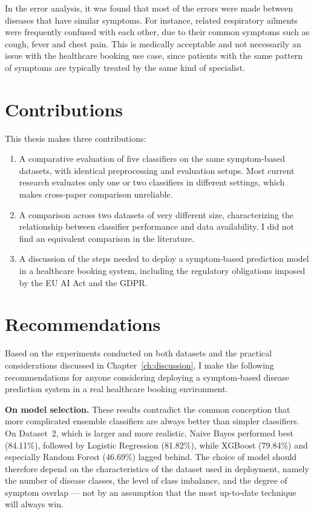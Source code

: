 In the error analysis, it was found that most of the errors were made between diseases that have similar symptoms. For instance, related respiratory ailments were frequently confused with each other, due to their common symptoms such as cough, fever and chest pain. This is medically acceptable and not necessarily an issue with the healthcare booking use case, since patients with the same pattern of symptoms are typically treated by the same kind of specialist.

\section{Contributions}
\label{sec:contributions}

This thesis makes three contributions:

\begin{enumerate}
    \item A comparative evaluation of five classifiers on the same symptom-based datasets, with identical preprocessing and evaluation setups. Most current research evaluates only one or two classifiers in different settings, which makes cross-paper comparison unreliable.
    \item A comparison across two datasets of very different size, characterizing the relationship between classifier performance and data availability. I did not find an equivalent comparison in the literature.
    \item A discussion of the steps needed to deploy a symptom-based prediction model in a healthcare booking system, including the regulatory obligations imposed by the EU AI Act and the GDPR.
\end{enumerate}

\section{Recommendations}
\label{sec:recommendations}

Based on the experiments conducted on both datasets and the practical considerations discussed in Chapter~\ref{ch:discussion}, I make the following recommendations for anyone considering deploying a symptom-based disease prediction system in a real healthcare booking environment.

\textbf{On model selection.} These results contradict the common conception that more complicated ensemble classifiers are always better than simpler classifiers. On Dataset~2, which is larger and more realistic, Naive Bayes performed best (84.11\%), followed by Logistic Regression (81.82\%), while XGBoost (79.84\%) and especially Random Forest (46.69\%) lagged behind. The choice of model should therefore depend on the characteristics of the dataset used in deployment, namely the number of disease classes, the level of class imbalance, and the degree of symptom overlap --- not by an assumption that the most up-to-date technique will always win.

